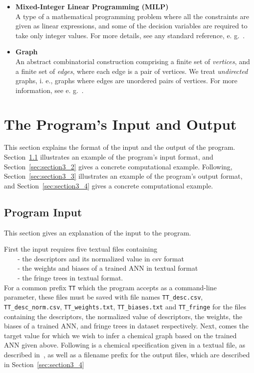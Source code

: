 \documentclass[11pt, titlepage, dvipdfmx, twoside]{article}
\begin{document}
\begin{itemize}
\item {\bf Mixed-Integer Linear Programming (MILP)}\\
%
A type of a mathematical programming problem
where all the constraints are given as linear expressions, and
some of the decision variables are required to take
only integer values.
For more details, see any standard reference, e. g.~\cite{LP}.


\item {\bf Graph} \\
An abstract combinatorial construction comprising
a finite set of {\em vertices}, and a finite set of {\em edges},
where each edge is a pair of vertices.
We treat {\em undirected} graphs,
i. e., graphs where edges are unordered pairs of vertices.
For more information, see e. g.~\cite{graph}.

\end{itemize}


\section{The Program's Input and Output}
\label{sec:InOut}

This section explains the format of the input and the output of the program.
Section~\ref{sec:section3_1} illustrates an example of the program's input format,
and Section~\ref{sec:section3_2} gives a concrete computational example.
Following, Section~\ref{sec:section3_3} illustrates an example of the program's output format,
and Section~\ref{sec:section3_4} gives a concrete computational example.


\subsection{Program Input}
\label{sec:section3_1}

This section gives an explanation of the input to the program.

First
the input requires five textual files containing \\
~~~~- the descriptors and its normalized value in csv format \\
~~~~- the weights and biases of a trained ANN in textual format \\
~~~~- the fringe trees in textual format.\\
For a common prefix {\tt TT} which the program accepts as a command-line parameter,
these files must be saved with file names {\tt TT\_desc.csv}, {\tt TT\_desc\_norm.csv}, 
{\tt TT\_weights.txt}, {\tt TT\_biases.txt} and {\tt TT\_fringe} for the files containing
the descriptors, the normalized value of descriptors,  the weights, the biases of a trained ANN, 
and fringe trees in dataset respectively.
%
Next, comes the target value for which we wish to infer 
a chemical graph based on the trained ANN given above.
Following is a chemical specification given in a textual file,
as described in~\cite{cyclic_BH_arxiv}, 
as well as a filename prefix for the output files,  which are described in Section~\ref{sec:section3_4}
\end{document}

